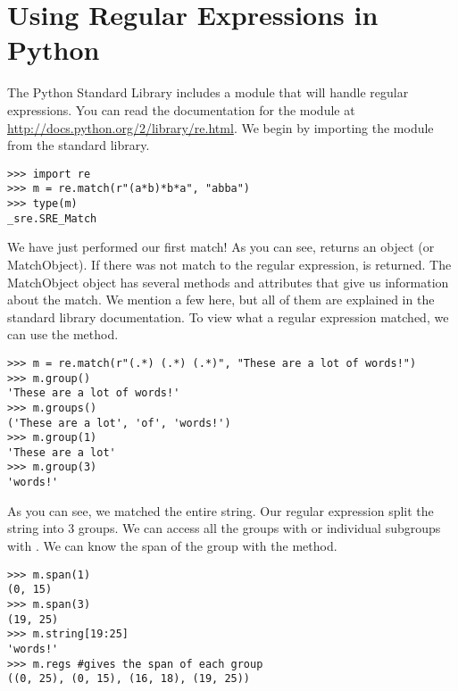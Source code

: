 \section*{Using Regular Expressions in Python}
The Python Standard Library includes a module that will handle regular expressions.
You can read the documentation for the module at \url{http://docs.python.org/2/library/re.html}.
We begin by importing the  module from the standard library.
\begin{lstlisting}
>>> import re
>>> m = re.match(r"(a*b)*b*a", "abba")
>>> type(m)
_sre.SRE_Match
\end{lstlisting}
We have just performed our first match!
As you can see,  returns an  object (or MatchObject).
If there was not match to the regular expression,  is returned.
The MatchObject object has several methods and attributes that give us information about the match.
We mention a few here, but all of them are explained in the standard library documentation.
To view what a regular expression matched, we can use the  method.
\begin{lstlisting}
>>> m = re.match(r"(.*) (.*) (.*)", "These are a lot of words!")
>>> m.group()
'These are a lot of words!'
>>> m.groups()
('These are a lot', 'of', 'words!')
>>> m.group(1)
'These are a lot'
>>> m.group(3)
'words!'
\end{lstlisting}
As you can see, we matched the entire string.
Our regular expression split the string into 3 groups.
We can access all the groups with  or individual subgroups with .
We can know the span of the group with the  method.
\begin{lstlisting}
>>> m.span(1)
(0, 15)
>>> m.span(3)
(19, 25)
>>> m.string[19:25]
'words!'
>>> m.regs #gives the span of each group
((0, 25), (0, 15), (16, 18), (19, 25))
\end{lstlisting}


